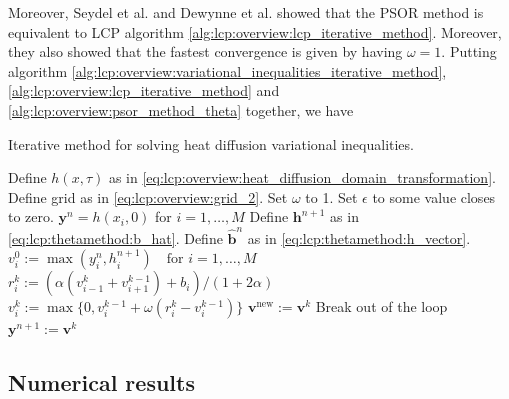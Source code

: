 Moreover, Seydel et al.\cite{seydel_2009} and Dewynne et al.\cite{dewynne_howison_wilmott_howison_1995} showed that the PSOR method is equivalent to LCP algorithm \eqref{alg:lcp:overview:lcp_iterative_method}. Moreover, they also showed that the fastest convergence is given by having $\omega=1$. Putting algorithm \eqref{alg:lcp:overview:variational_inequalities_iterative_method}, \eqref{alg:lcp:overview:lcp_iterative_method} and \eqref{alg:lcp:overview:psor_method_theta} together, we have
\begin{algorithm}[H]
  \caption{Iterative method for solving heat diffusion variational inequalities.}\label{alg:lcp:psor:amer_option_solution}
  \begin{algorithmic}[1]
  \State Define $h(x,\tau)$ as in \eqref{eq:lcp:overview:heat_diffusion_domain_transformation}.
  \State Define grid as in \eqref{eq:lcp:overview:grid_2}.
  \State Set $\omega$ to 1.
  \State Set $\epsilon$ to some value closes to zero.
  \State $\mathbf{y}^{n}=h(x_i, 0)$ for $i=1,\dots,M$
   
    \State Define $\mathbf{h}^{n+1}$ as in \eqref{eq:lcp:thetamethod:b_hat}.
    \State Define $\hat{\mathbf{b}}^n$ as in \eqref{eq:lcp:thetamethod:h_vector}.
    \State $v^{0}_{i} := \max(y^{n}_i, h^{n+1}_i) \quad \text{for $i=1,\dots,M$}$
    \State $r^{k}_{i} := (\alpha(v^{k}_{i-1} + v^{k-1}_{i+1}) + b_i)/(1+2\alpha)$ 
    \State $v^{k}_{i} := \max\big\{0, v^{k-1}_i + \omega(r^{k}_{i} - v^{k-1}_i)\big\}$
    \EndFor
      \State $\mathbf{v}^{\text{new}} := \mathbf{v}^{k}$
      \State Break out of the loop
    \EndIf
    \EndFor
    \State $\mathbf{y}^{n+1} :=\mathbf{v}^{k}$
  \EndFor
\end{algorithmic}
\end{algorithm}

\subsection{Numerical results}

